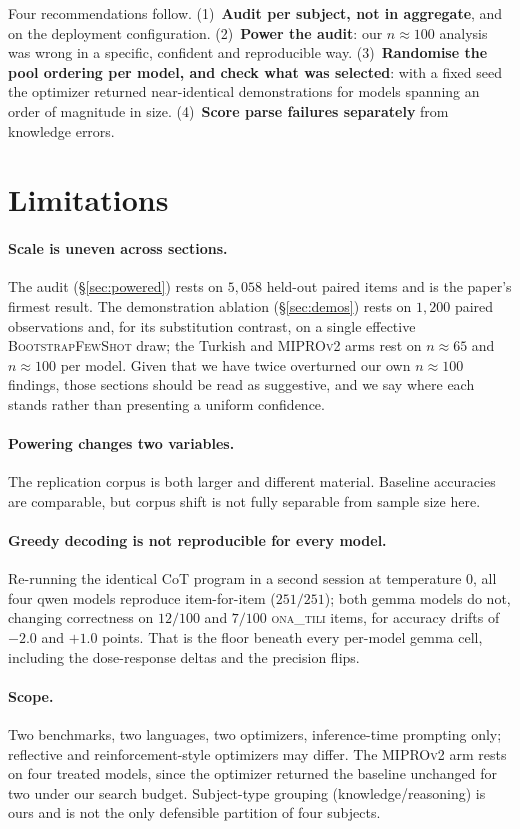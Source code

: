 \documentclass[11pt]{article}
\newcommand{\ona}{\textsc{ona\_tili}}
\newcommand{\bsfs}{\textsc{BootstrapFewShot}}
\begin{document}
Four recommendations follow. (1)~\textbf{Audit per subject, not in aggregate}, and on
the deployment configuration. (2)~\textbf{Power the audit}: our $n{\approx}100$ analysis
was wrong in a specific, confident and reproducible way. (3)~\textbf{Randomise the pool ordering per model, and check what was selected}: with a
fixed seed the optimizer returned near-identical demonstrations for models spanning an
order of magnitude in size.
(4)~\textbf{Score parse failures separately} from knowledge errors.

\section*{Limitations}
\paragraph{Scale is uneven across sections.} The audit (\S\ref{sec:powered}) rests on
$5{,}058$ held-out paired items and is the paper's firmest result. The demonstration
ablation (\S\ref{sec:demos}) rests on $1{,}200$ paired observations and, for its
substitution contrast, on a single effective \bsfs{} draw; the Turkish and
\textsc{MIPROv2} arms rest on $n{\approx}65$ and $n{\approx}100$ per model. Given that we
have twice overturned our own $n{\approx}100$ findings, those sections should be read as
suggestive, and we say where each stands rather than presenting a uniform confidence.
\paragraph{Powering changes two variables.} The replication corpus is both larger and
different material. Baseline accuracies are comparable, but corpus shift is not fully
separable from sample size here.
\paragraph{Greedy decoding is not reproducible for every model.} Re-running the identical
CoT program in a second session at temperature $0$, all four qwen models reproduce
item-for-item ($251/251$); both gemma models do not, changing correctness on $12/100$ and
$7/100$ \ona{} items, for accuracy drifts of $-2.0$ and $+1.0$ points. That is the floor
beneath every per-model gemma cell, including the dose-response deltas and the precision
flips.
\paragraph{Scope.} Two benchmarks, two languages, two optimizers, inference-time
prompting only; reflective and reinforcement-style optimizers may differ. The
\textsc{MIPROv2} arm rests on four treated models, since the optimizer returned the
baseline unchanged for two under our search budget. Subject-type grouping
(knowledge/reasoning) is ours and is not the only defensible partition of four subjects.
\end{document}
